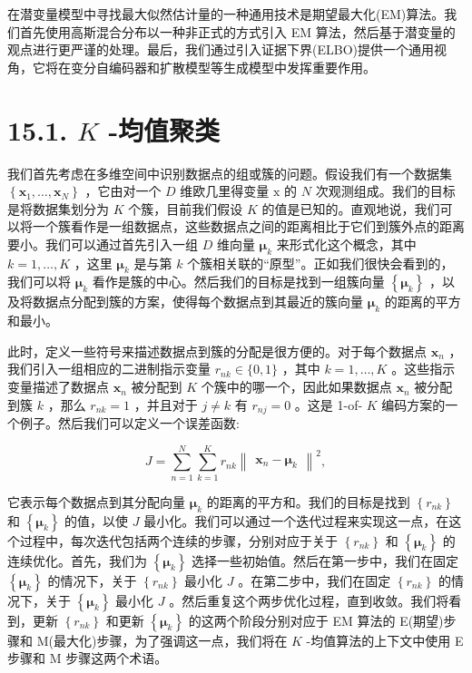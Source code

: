 \documentclass[10pt]{report}
\begin{document}
在潜变量模型中寻找最大似然估计量的一种通用技术是期望最大化(EM)算法。我们首先使用高斯混合分布以一种非正式的方式引入 EM 算法，然后基于潜变量的观点进行更严谨的处理。最后，我们通过引入证据下界(ELBO)提供一个通用视角，它将在变分自编码器和扩散模型等生成模型中发挥重要作用。

\section*{15.1. \(K\) -均值聚类}

我们首先考虑在多维空间中识别数据点的组或簇的问题。假设我们有一个数据集 \(\left\{  {{\mathbf{x}}_{1},\ldots ,{\mathbf{x}}_{N}}\right\}\) ，它由对一个 \(D\) 维欧几里得变量 \(\mathrm{x}\) 的 \(N\) 次观测组成。我们的目标是将数据集划分为 \(K\) 个簇，目前我们假设 \(K\) 的值是已知的。直观地说，我们可以将一个簇看作是一组数据点，这些数据点之间的距离相比于它们到簇外点的距离要小。我们可以通过首先引入一组 \(D\) 维向量 \({\mathbf{\mu }}_{k}\) 来形式化这个概念，其中 \(k = 1,\ldots ,K\) ，这里 \({\mathbf{\mu }}_{k}\) 是与第 \(k\) 个簇相关联的“原型”。正如我们很快会看到的，我们可以将 \({\mathbf{\mu }}_{k}\) 看作是簇的中心。然后我们的目标是找到一组簇向量 \(\left\{  {\mathbf{\mu }}_{k}\right\}\) ，以及将数据点分配到簇的方案，使得每个数据点到其最近的簇向量 \({\mathbf{\mu }}_{k}\) 的距离的平方和最小。

此时，定义一些符号来描述数据点到簇的分配是很方便的。对于每个数据点 \({\mathbf{x}}_{n}\) ，我们引入一组相应的二进制指示变量 \({r}_{nk} \in  \{ 0,1\}\) ，其中 \(k = 1,\ldots ,K\) 。这些指示变量描述了数据点 \({\mathbf{x}}_{n}\) 被分配到 \(K\) 个簇中的哪一个，因此如果数据点 \({\mathbf{x}}_{n}\) 被分配到簇 \(k\) ，那么 \({r}_{nk} = 1\) ，并且对于 \(j \neq  k\) 有 \({r}_{nj} = 0\) 。这是 1-of- \(K\) 编码方案的一个例子。然后我们可以定义一个误差函数:

\[
J = \mathop{\sum }\limits_{{n = 1}}^{N}\mathop{\sum }\limits_{{k = 1}}^{K}{r}_{nk}{\begin{Vmatrix}{\mathbf{x}}_{n} - {\mathbf{\mu }}_{k}\end{Vmatrix}}^{2}, \tag{15.1}
\]

它表示每个数据点到其分配向量 \({\mathbf{\mu }}_{k}\) 的距离的平方和。我们的目标是找到 \(\left\{  {r}_{nk}\right\}\) 和 \(\left\{  {\mathbf{\mu }}_{k}\right\}\) 的值，以使 \(J\) 最小化。我们可以通过一个迭代过程来实现这一点，在这个过程中，每次迭代包括两个连续的步骤，分别对应于关于 \(\left\{  {r}_{nk}\right\}\) 和 \(\left\{  {\mathbf{\mu }}_{k}\right\}\) 的连续优化。首先，我们为 \(\left\{  {\mathbf{\mu }}_{k}\right\}\) 选择一些初始值。然后在第一步中，我们在固定 \(\left\{  {\mathbf{\mu }}_{k}\right\}\) 的情况下，关于 \(\left\{  {r}_{nk}\right\}\) 最小化 \(J\) 。在第二步中，我们在固定 \(\left\{  {r}_{nk}\right\}\) 的情况下，关于 \(\left\{  {\mathbf{\mu }}_{k}\right\}\) 最小化 \(J\) 。然后重复这个两步优化过程，直到收敛。我们将看到，更新 \(\left\{  {r}_{nk}\right\}\) 和更新 \(\left\{  {\mathbf{\mu }}_{k}\right\}\) 的这两个阶段分别对应于 EM 算法的 E(期望)步骤和 M(最大化)步骤，为了强调这一点，我们将在 \(K\) -均值算法的上下文中使用 E 步骤和 M 步骤这两个术语。
\end{document}
